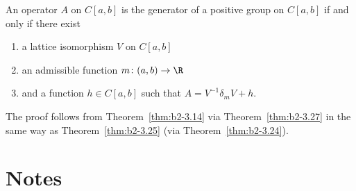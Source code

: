 \begin{theorem}\label{thm:b2-3.28}
%
An operator $A$ on $C[a,b]$ is the generator of a positive group on $C[a,b]$ if and only if there exist
\begin{enumerate}[\upshape (i)]
\item 
a lattice isomorphism $V$ on $C[a,b]$
\item 
an admissible function $m \colon (a,b) \to \R$
\item 
and a function $h \in C[a,b]$ such that $A = V^{-1}\delta_{m}V + h$.
\end{enumerate}
\end{theorem}
The proof follows from Theorem~\ref{thm:b2-3.14} via Theorem~\ref{thm:b2-3.27} in the same way as Theorem~\ref{thm:b2-3.25} (via Theorem~\ref{thm:b2-3.24}).
\section*{Notes}
\label{notes:b2}

